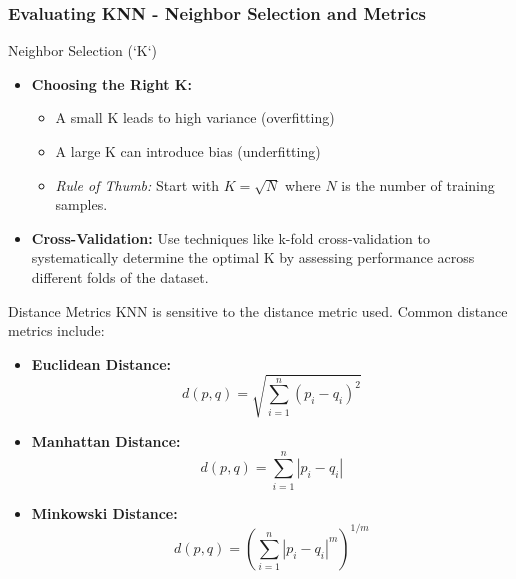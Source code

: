 \documentclass[aspectratio=169]{beamer}
\begin{document}
\begin{frame}[fragile]
  \frametitle{Evaluating KNN - Neighbor Selection and Metrics}
  \begin{block}{Neighbor Selection (`K`)}
    \begin{itemize}
      \item \textbf{Choosing the Right K:}
        \begin{itemize}
          \item A small K leads to high variance (overfitting)
          \item A large K can introduce bias (underfitting)
          \item \textit{Rule of Thumb:} Start with \( K = \sqrt{N} \) where \( N \) is the number of training samples.
        \end{itemize}
        
      \item \textbf{Cross-Validation:}
        Use techniques like k-fold cross-validation to systematically determine the optimal K by assessing performance across different folds of the dataset.
    \end{itemize}
  \end{block}
  
  \begin{block}{Distance Metrics}
    KNN is sensitive to the distance metric used. Common distance metrics include:

    \begin{itemize}
      \item \textbf{Euclidean Distance:}
        \begin{equation}
        d(p, q) = \sqrt{\sum_{i=1}^{n}(p_i - q_i)^2}
        \end{equation}

      \item \textbf{Manhattan Distance:}
        \begin{equation}
        d(p, q) = \sum_{i=1}^{n}|p_i - q_i|
        \end{equation}

      \item \textbf{Minkowski Distance:}
        \begin{equation}
        d(p, q) = \left(\sum_{i=1}^{n} |p_i - q_i|^m \right)^{1/m}
        \end{equation}
    \end{itemize}
  \end{block}
\end{frame}
\end{document}
